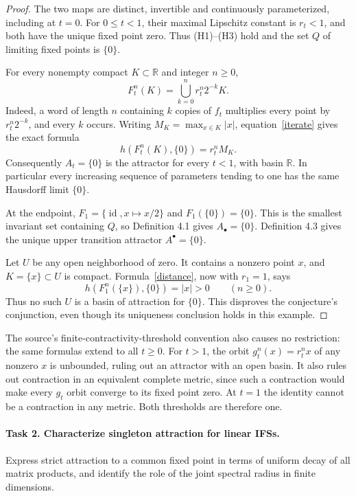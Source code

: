 \documentclass[11pt]{article}
\newcommand{\R}{\mathbb R}
\newcommand{\Al}{A_{\bullet}}
\newcommand{\Au}{A^{\bullet}}
\begin{document}
\begin{proof}
The two maps are distinct, invertible and continuously parameterized,
including at $t=0$. For $0\leq t<1$, their maximal Lipschitz constant
is $r_t<1$, and both have the unique fixed point zero. Thus (H1)--(H3)
hold and the set $Q$ of limiting fixed points is $\{0\}$.

For every nonempty compact $K\subset\R$ and integer $n\geq0$,
\begin{equation}\label{iterate}
 F_t^n(K)=\bigcup_{k=0}^{n} r_t^n2^{-k}K.
\end{equation}
Indeed, a word of length $n$ containing $k$ copies of $f_t$ multiplies
every point by $r_t^n2^{-k}$, and every $k$ occurs. Writing
$M_K=\max_{x\in K}|x|$, equation~\eqref{iterate} gives the exact formula
\begin{equation}\label{distance}
 h(F_t^n(K),\{0\})=r_t^n M_K.
\end{equation}
Consequently $A_t=\{0\}$ is the attractor for every $t<1$, with basin
$\R$. In particular every increasing sequence of parameters tending
to one has the same Hausdorff limit $\{0\}$.

At the endpoint, $F_1=\{\operatorname{id},x\mapsto x/2\}$ and
$F_1(\{0\})=\{0\}$. This is the smallest invariant set containing
$Q$, so Definition 4.1 gives $\Al=\{0\}$. Definition 4.3 gives the
unique upper transition attractor $\Au=\{0\}$.

Let $U$ be any open neighborhood of zero. It contains a nonzero point
$x$, and $K=\{x\}\subset U$ is compact. Formula~\eqref{distance}, now
with $r_1=1$, says
\[
 h(F_1^n(\{x\}),\{0\})=|x|>0\qquad(n\geq0).
\]
Thus no such $U$ is a basin of attraction for $\{0\}$. This disproves
the conjecture's conjunction, even though its uniqueness conclusion
holds in this example.
\end{proof}

The source's finite-contractivity-threshold convention also causes
no restriction: the same formulas extend to all $t\geq0$. For $t>1$,
the orbit $g_t^n(x)=r_t^nx$ of any nonzero $x$ is unbounded, ruling out
an attractor with an open basin. It also rules out contraction in an
equivalent complete metric, since such a contraction would make every
$g_t$ orbit converge to its fixed point zero. At $t=1$ the identity
cannot be a contraction in any metric. Both thresholds are therefore
one.

\paragraph{Task 2. Characterize singleton attraction for linear IFSs.}
Express strict attraction to a common fixed point in terms of uniform
decay of all matrix products, and identify the role of the joint
spectral radius in finite dimensions.
\end{document}
